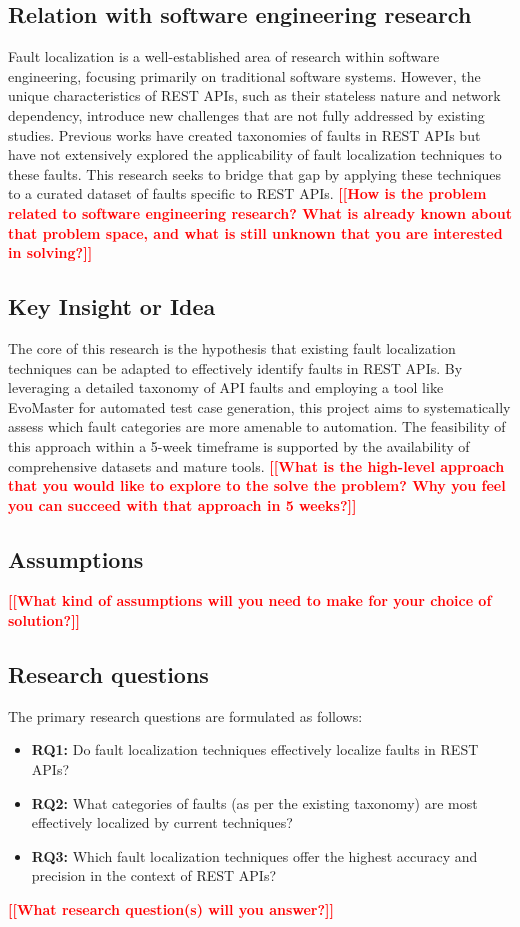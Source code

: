 \documentclass[conference]{IEEEtran}
\newcommand{\todo}[1]{\textcolor{red}{{\bfseries [[#1]]}}}
\begin{document}
\subsection{Relation with software engineering research}
    Fault localization is a well-established area of research within software engineering, focusing primarily on traditional software systems. However, the unique characteristics of REST APIs, such as their stateless nature and network dependency, introduce new challenges that are not fully addressed by existing studies. Previous works have created taxonomies of faults in REST APIs but have not extensively explored the applicability of fault localization techniques to these faults. This research seeks to bridge that gap by applying these techniques to a curated dataset of faults specific to REST APIs.
    \todo{How is the problem related to software engineering research? What is already known about that problem space, and what is still unknown that you are interested in solving?}

\subsection{Key Insight or Idea}
    The core of this research is the hypothesis that existing fault localization techniques can be adapted to effectively identify faults in REST APIs. By leveraging a detailed taxonomy of API faults and employing a tool like EvoMaster for automated test case generation, this project aims to systematically assess which fault categories are more amenable to automation. The feasibility of this approach within a 5-week timeframe is supported by the availability of comprehensive datasets and mature tools.
    \todo{What is the high-level approach that you would like to explore to the solve the problem? Why you feel you can succeed with that approach in 5 weeks?}

\subsection{Assumptions}
    \todo{What kind of assumptions will you need to make for your choice of solution?}

\subsection{Research questions}
    The primary research questions are formulated as follows:
    \begin{itemize}
        \item \textbf{RQ1:} Do fault localization techniques effectively localize faults in REST APIs?
        \item \textbf{RQ2:} What categories of faults (as per the existing taxonomy) are most effectively localized by current techniques?
        \item \textbf{RQ3:} Which fault localization techniques offer the highest accuracy and precision in the context of REST APIs?
    \end{itemize}
    \todo{What research question(s) will you answer?}
\end{document}
